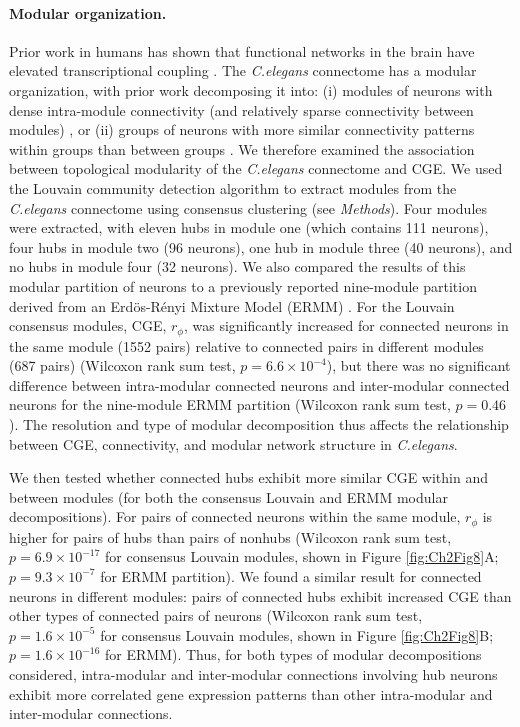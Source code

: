 {\paragraph{Modular organization.}

Prior work in humans has shown that functional networks in the brain have elevated transcriptional coupling \citep{Richiardi2015}.
The \emph{C.elegans} connectome has a modular organization, with prior work decomposing it into:
(i) modules of neurons with dense intra-module connectivity (and relatively sparse connectivity between modules) \citep{Kim2014a, Pan2010, Bassett2010}, or
(ii) groups of neurons with more similar connectivity patterns within groups than between groups \citep{Achacoso1992, Pavlovic2014}.
We therefore examined the association between topological modularity of the \emph{C.elegans} connectome and CGE.
We used the Louvain community detection algorithm \citep{Blondel2008} to extract modules from the \emph{C.elegans} connectome using consensus clustering (see \textit{Methods}).
Four modules were extracted, with eleven hubs in module one (which contains 111 neurons), four hubs in module two (96 neurons), one hub in module three (40 neurons), and no hubs in module four (32 neurons).
We also compared the results of this modular partition of neurons to a previously reported nine-module partition derived from an Erd\"os-R\'enyi Mixture Model (ERMM) \citep{Pavlovic2014}.
For the Louvain consensus modules, CGE, $r_\phi$, was significantly increased for connected neurons in the same module (1552 pairs) relative to connected pairs in different modules (687 pairs) (Wilcoxon rank sum test, $p = 6.6 \times 10^{-4}$), but there was no significant difference between intra-modular connected neurons and inter-modular connected neurons for the nine-module ERMM partition (Wilcoxon rank sum test, $p = 0.46$).
The resolution and type of modular decomposition thus affects the relationship between CGE, connectivity, and modular network structure in \emph{C.elegans}.

We then tested whether connected hubs exhibit more similar CGE within and between modules (for both the consensus Louvain and ERMM modular decompositions).
For pairs of connected neurons within the same module, $r_\phi$ is higher for pairs of hubs than pairs of nonhubs (Wilcoxon rank sum test, $p = 6.9\times 10^{-17}$ for consensus Louvain modules, shown in Figure \ref{fig:Ch2Fig8}A; $p = 9.3 \times 10^{-7}$ for ERMM partition).
We found a similar result for connected neurons in different modules: pairs of connected hubs exhibit increased CGE than other types of connected pairs of neurons (Wilcoxon rank sum test, $p = 1.6 \times 10^{-5}$ for consensus Louvain modules, shown in Figure \ref{fig:Ch2Fig8}B; $p = 1.6 \times 10^{-16}$ for ERMM).
Thus, for both types of modular decompositions considered, intra-modular and inter-modular connections involving hub neurons exhibit more correlated gene expression patterns than other intra-modular and inter-modular connections.

}
